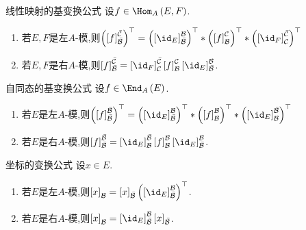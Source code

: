 \begin{proposition}{线性映射的基变换公式}{}
	设$f\in\Hom_{A}\left(E,F\right)$.
	\begin{enumerate}
		\item 若$E,F$是左$A$-模,则$\left(\left[f\right]_{\bar{\mathcal{B}}}^{\bar{\mathcal{C}}}\right)^{\top}=\left(\left[\id_{E}\right]_{\bar{\mathcal{B}}}^{\mathcal{B}}\right)^{\top}\ast\left(\left[f\right]_{\mathcal{B}}^{\mathcal{C}}\right)^{\top}\ast\left(\left[\id_{F}\right]_{\mathcal{C}}^{\bar{\mathcal{C}}}\right)^{\top}$
		\item 若$E,F$是右$A$-模,则$\left[f\right]_{\bar{\mathcal{B}}}^{\bar{\mathcal{C}}}=\left[\id_{F}\right]_{\mathcal{C}}^{\bar{\mathcal{C}}}\left[f\right]_{\mathcal{B}}^{\mathcal{C}}\left[\id_{E}\right]_{\bar{\mathcal{B}}}^{\mathcal{B}}$.
	\end{enumerate}
\end{proposition}

\begin{corollary}{自同态的基变换公式}{}
	设$f\in\End_{A}\left(E\right)$.
	\begin{enumerate}
		\item 若$E$是左$A$-模,则$\left(\left[f\right]_{\bar{\mathcal{B}}}^{\bar{\mathcal{B}}}\right)^{\top}=\left(\left[\id_{E}\right]_{\bar{\mathcal{B}}}^{\mathcal{B}}\right)^{\top}\ast\left(\left[f\right]_{\mathcal{B}}^{\mathcal{B}}\right)^{\top}\ast\left(\left[\id_{E}\right]_{\mathcal{B}}^{\bar{\mathcal{B}}}\right)^{\top}$
		\item 若$E$是右$A$-模,则$\left[f\right]_{\bar{\mathcal{B}}}^{\bar{\mathcal{B}}}=\left[\id_{E}\right]_{\mathcal{B}}^{\bar{\mathcal{B}}}\left[f\right]_{\mathcal{B}}^{\mathcal{B}}\left[\id_{E}\right]_{\bar{\mathcal{B}}}^{\mathcal{B}}$.
	\end{enumerate}
\end{corollary}

\begin{corollary}{坐标的变换公式}{}
	设$x\in E$.
	\begin{enumerate}
		\item 若$E$是左$A$-模,则$\left[x\right]_{\mathcal{B}}=\left[x\right]_{\bar{\mathcal{B}}}\left(\left[\id_{E}\right]_{\bar{\mathcal{B}}}^{\mathcal{B}}\right)^{\top}$.
		\item 若$E$是右$A$-模,则$\left[x\right]_{\mathcal{B}}=\left[\id_{E}\right]_{\bar{\mathcal{B}}}^{\mathcal{B}}\left[x\right]_{\bar{\mathcal{B}}}$.
	\end{enumerate}
\end{corollary}


